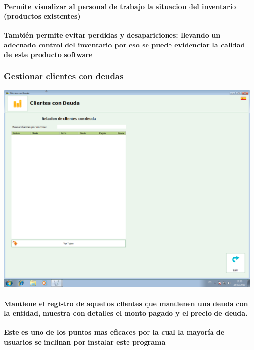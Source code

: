 \documentclass[12pt,a4paper]{ articule }
\begin{document}
\paragraph{Permite visualizar al personal de trabajo la situacion del inventario (productos existentes)} 
\paragraph{También permite evitar perdidas y desapariciones: llevando un adecuado control del inventario por eso se puede evidenciar la calidad de este producto software}

\subsubsection*{Gestionar clientes con deudas}
\includegraphics[scale=0.35]{Clientes con deuda.png} 
\paragraph{Mantiene el registro de aquellos clientes que mantienen una deuda con la entidad, muestra con detalles el monto pagado y el precio de deuda.}
\paragraph{Este es uno de los puntos mas eficaces por la cual la mayoría de usuarios se inclinan por instalar este programa}
\end{document}
